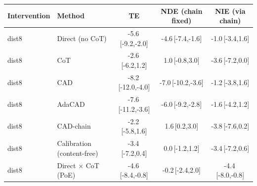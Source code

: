 \begin{tabular}{llccc}
\toprule
Intervention & Method & TE & NDE (chain fixed) & NIE (via chain) \\
\midrule
dist8 & Direct (no CoT) & -5.6\,{\scriptsize[-9.2,-2.0]} & -4.6\,{\scriptsize[-7.4,-1.6]} & -1.0\,{\scriptsize[-3.4,1.6]} \\
dist8 & CoT & -2.6\,{\scriptsize[-6.2,1.2]} & 1.0\,{\scriptsize[-0.8,3.0]} & -3.6\,{\scriptsize[-7.2,0.0]} \\
dist8 & CAD & -8.2\,{\scriptsize[-12.0,-4.0]} & -7.0\,{\scriptsize[-10.2,-3.6]} & -1.2\,{\scriptsize[-3.8,1.6]} \\
dist8 & AdaCAD & -7.6\,{\scriptsize[-11.2,-3.6]} & -6.0\,{\scriptsize[-9.2,-2.8]} & -1.6\,{\scriptsize[-4.2,1.2]} \\
dist8 & CAD-chain & -2.2\,{\scriptsize[-5.8,1.6]} & 1.6\,{\scriptsize[0.2,3.0]} & -3.8\,{\scriptsize[-7.6,0.2]} \\
dist8 & Calibration (content-free) & -3.4\,{\scriptsize[-7.2,0.4]} & 0.0\,{\scriptsize[-1.2,1.2]} & -3.4\,{\scriptsize[-7.2,0.6]} \\
dist8 & Direct $\times$ CoT (PoE) & -4.6\,{\scriptsize[-8.4,-0.8]} & -0.2\,{\scriptsize[-2.4,2.0]} & -4.4\,{\scriptsize[-8.0,-0.8]} \\
\bottomrule
\end{tabular}
